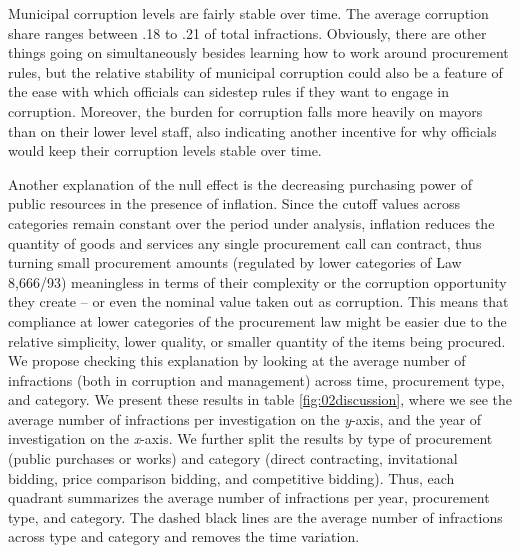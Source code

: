 \documentclass[11pt]{article}
\begin{document}
Municipal corruption levels are fairly stable over time. The average corruption share ranges between .18 to .21 of total infractions. Obviously, there are other things going on simultaneously besides learning how to work around procurement rules, but the relative stability of municipal corruption could also be a feature of the ease with which officials can sidestep rules if they want to engage in corruption. Moreover, the burden for corruption falls more heavily on mayors \citep{AvisGovernmentAuditsReduce2018} than on their lower level staff, also indicating another incentive for why officials would keep their corruption levels stable over time.

Another explanation of the null effect is the decreasing purchasing power of public resources in the presence of inflation. Since the cutoff values across categories remain constant over the period under analysis, inflation reduces the quantity of goods and services any single procurement call can contract, thus turning small procurement amounts (regulated by lower categories of Law 8,666/93) meaningless in terms of their complexity or the corruption opportunity they create -- or even the nominal value taken out as corruption. This means that compliance at lower categories of the procurement law might be easier due to the relative simplicity, lower quality, or smaller quantity of the items being procured. We propose checking this explanation by looking at the average number of infractions (both in corruption and management) across time, procurement type, and category. We present these results in table \ref{fig:02discussion}, where we see the average number of infractions per investigation on the \emph{y}-axis, and the year of investigation on the \emph{x}-axis. We further split the results by type of procurement (public purchases or works) and category (direct contracting, invitational bidding, price comparison bidding, and competitive bidding). Thus, each quadrant summarizes the average number of infractions per year, procurement type, and category. The dashed black lines are the average number of infractions across type and category and removes the time variation.
\end{document}
